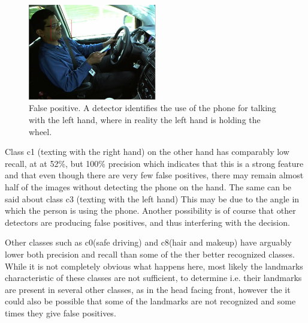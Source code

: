 \documentclass[10pt,twocolumn,letterpaper]{article}
\begin{document}
\begin{figure}[h]
	\centering
	\includegraphics[width=0.5\textwidth]{mult_HOG/talk_phone_left}
	\caption{False positive. A detector identifies the use of the phone for talking with the left hand, where in reality the left hand is holding the wheel. }
	\label{Landmarks_false_detection}
\end{figure}

Class c1 (texting with the right hand) on the other hand has comparably low recall, at at 52\%, but 100\% precision which indicates that this is a strong feature and that even though there are very few false positives, there may remain almost half of the images without detecting the phone on the hand. The same can be said about class c3 (texting with the left hand) This may be due to the angle in which the person is using the phone. Another possibility is of course that other detectors are producing false positives, and thus interfering with the decision.

Other classes such as c0(safe driving) and c8(hair and makeup) have arguably lower both precision and recall than some of the ther better recognized classes. While it is not completely obvious what happens here, most likely the landmarks characteristic of these classes are not sufficient, to determine i.e. their landmarks are present in several other classes, as in the head facing front, however the it could also be possible that some of the landmarks are not recognized and some times they give false positives.
\end{document}
